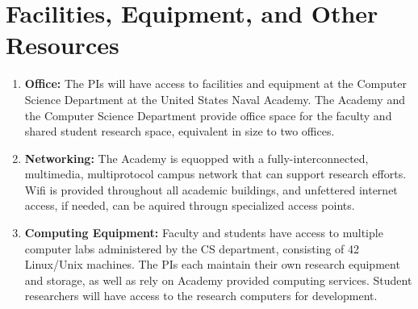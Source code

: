 
\part{Facilities, Equipment, and Other Resources}

\begin{enumerate}

\item {\bf Office:} The PIs will have access to facilities and
  equipment at the Computer Science Department at the United States Naval
   Academy. The Academy and the Computer Science Department provide office
   space for the faculty and shared student research space, equivalent in size
   to two offices.

\item {\bf Networking:} The Academy is equopped with a
  fully-interconnected, multimedia, multiprotocol campus network that
  can support research efforts. Wifi is provided throughout all
  academic buildings, and unfettered internet access, if needed, can
  be aquired througn specialized access points.

\item {\bf Computing Equipment:} Faculty and students have access to
  multiple computer labs administered by the CS department, consisting
  of 42 Linux/Unix machines. The PIs each maintain their own research
  equipment and storage, as well as rely on Academy provided computing
  services. Student researchers will have access to the
  research computers for development.

\end{enumerate}
